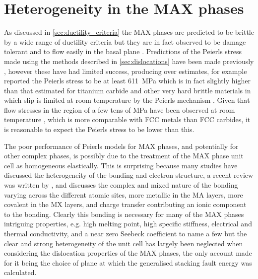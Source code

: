 \chapter{Heterogeneity in the MAX phases}

\graphicspath{{Chapter3/Figs/}}


As  discussed in \autoref{sec:ductility_criteria} the MAX phases are predicted to be brittle by a wide range of ductility criteria but they are in fact observed to be damage tolerant and to flow easily in the basal plane \cite{Barsoum1999}.
Predictions of the Peierls stress made using the methods described in \autoref{sec:dislocations} have been made previously \cite{Music2007ductility,Gouriet2015}, however these have had limited success, producing over estimates, for example \citet{Gouriet2015} reported the Peierls stress to be at least \SI{611}{\mega\pascal} which is in fact slightly higher than that estimated for titanium carbide and other very hard brittle materials in which slip is limited at room temperature by the Peierls mechanism \cite{Chang1966,Clegg2006,Kamimura2011,Yadav2014}. Given that flow stresses in the region of a few tens of \si{\mega\pascal} have been observed at room temperature \cite{Humphrey2012,Barsoum1999}, which is more comparable with FCC metals than FCC carbides, it is reasonable to expect the Peierls stress to be lower than this.

The poor performance of Peierls models for MAX phases, and potentially for other complex phases, is possibly due to the treatment of the MAX phase unit cell as homogeneous elastically. This is surprising because many studies have discussed the heterogeneity of the bonding and electron structure, a recent review was written by \citet{Magnuson2017}, and discusses the complex and mixed nature of the bonding varying across the different atomic sites, more metallic in the MA layers, more covalent in the MX layers, and charge transfer contributing an ionic component to the bonding. Clearly this bonding is necessary for many of the MAX phases intriguing properties, e.g. high melting point, high specific stiffness, electrical and thermal conductivity, and a near zero Seebeck coefficient to name a few \cite{Yoo2000,Sun2011,Magnuson2017} but the clear and strong heterogeneity of the unit cell has largely been neglected when considering the dislocation properties of the MAX phases, the only account made for it being the choice of plane at which the generalised stacking fault energy was calculated.

